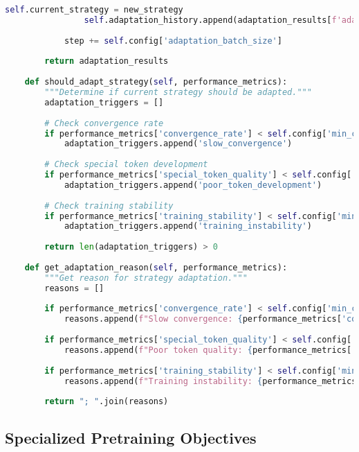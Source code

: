 \begin{lstlisting}[language=Python, caption=Progressive curriculum framework for special token pretraining]
                self.current_strategy = new_strategy
                self.adaptation_history.append(adaptation_results[f'adaptation_{len(self.adaptation_history)}'])
            
            step += self.config['adaptation_batch_size']
        
        return adaptation_results
    
    def should_adapt_strategy(self, performance_metrics):
        """Determine if current strategy should be adapted."""
        adaptation_triggers = []
        
        # Check convergence rate
        if performance_metrics['convergence_rate'] < self.config['min_convergence_rate']:
            adaptation_triggers.append('slow_convergence')
        
        # Check special token development
        if performance_metrics['special_token_quality'] < self.config['min_token_quality']:
            adaptation_triggers.append('poor_token_development')
        
        # Check training stability
        if performance_metrics['training_stability'] < self.config['min_stability']:
            adaptation_triggers.append('training_instability')
        
        return len(adaptation_triggers) > 0
    
    def get_adaptation_reason(self, performance_metrics):
        """Get reason for strategy adaptation."""
        reasons = []
        
        if performance_metrics['convergence_rate'] < self.config['min_convergence_rate']:
            reasons.append(f"Slow convergence: {performance_metrics['convergence_rate']:.3f}")
        
        if performance_metrics['special_token_quality'] < self.config['min_token_quality']:
            reasons.append(f"Poor token quality: {performance_metrics['special_token_quality']:.3f}")
        
        if performance_metrics['training_stability'] < self.config['min_stability']:
            reasons.append(f"Training instability: {performance_metrics['training_stability']:.3f}")
        
        return "; ".join(reasons)
\end{lstlisting}

\subsection{Specialized Pretraining Objectives}

